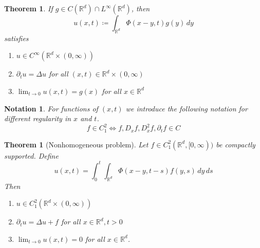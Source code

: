 \documentclass{report}
\theoremstyle{tommy}
\newtheorem{thm}[defn]{Theorem}
\newtheorem{nota}[defn]{Notation}
\begin{document}
  \begin{thm}
    If \(g \in C(\mathbb{R}^d) \cap L^\infty(\mathbb{R}^d)\), then 
    \[u(x,t) \coloneqq \int_{\mathbb{R}^d} \Phi(x-y,t) g(y) \, dy\]
    satisfies
    
    \begin{enumerate}[label=(\roman*)]
      \item \(u \in C^\infty(\mathbb{R}^d \times (0,\infty))\)
      \item \(\partial_t u = \Delta u\) for all \((x,t) \in \mathbb{R}^d \times (0,\infty)\)
      \item \(\lim_{t \to 0} u(x,t) = g(x)\) for all \(x \in \mathbb{R}^d\)
    \end{enumerate}
  \end{thm}

  \begin{nota}
    For functions of \((x,t)\) we introduce the following notation for different regularity in \(x\) and \(t\).
    \[f \in C_1^2 \Leftrightarrow f, D_x f, D_x^2 f, \partial_t f \in C\]
  \end{nota}

  \begin{thm}[Nonhomogeneous problem]
    Let \(f \in C_1^2(\mathbb{R}^d, [0,\infty))\) be compactly supported. Define
    \[u(x,t) = \int_0^t \int_{\mathbb{R}^d} \Phi(x-y, t-s) f(y,s) \, dy\, ds\]
    Then 
    \begin{enumerate}[label=(\roman*)]
      \item \(u \in C_1^2(\mathbb{R}^d \times (0,\infty))\)
      \item \(\partial_t u = \Delta u+ f\) for all \(x \in \mathbb{R}^d, t > 0\)
      \item \(\lim_{t \to 0} u(x,t) = 0\) for all \(x \in \mathbb{R}^d\).
    \end{enumerate}
  \end{thm}
\end{document}
